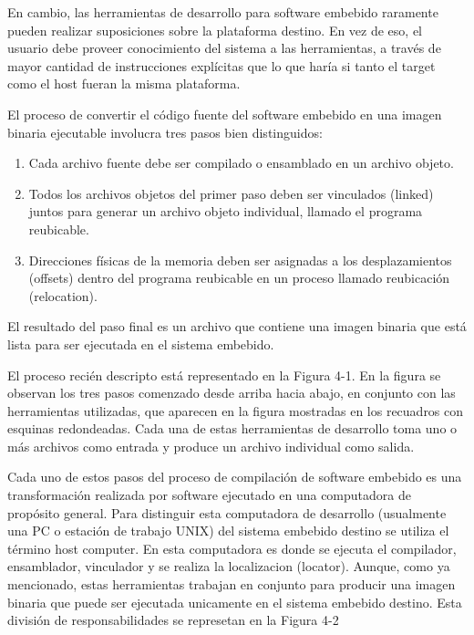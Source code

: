 \documentclass[12pt]{article}
\begin{document}

En cambio, las herramientas de desarrollo para software embebido 
raramente pueden realizar suposiciones sobre la plataforma destino.
En vez de eso, el usuario debe proveer 
conocimiento del sistema a las herramientas, a través 
de mayor cantidad de instrucciones explícitas que lo que haría
si tanto el target como el host fueran la misma plataforma.

El proceso de convertir el código fuente del software embebido
en una imagen binaria ejecutable involucra tres pasos bien distinguidos:

\begin{enumerate}
\item Cada archivo fuente debe ser compilado o ensamblado en un archivo objeto.
\item Todos los archivos objetos del primer paso deben ser vinculados (linked)
juntos para generar un archivo objeto individual, llamado el programa reubicable.
\item Direcciones físicas de la memoria deben ser asignadas a los desplazamientos (offsets)
dentro del programa reubicable en un proceso llamado reubicación (relocation).
\end{enumerate}

El resultado del paso final es un archivo que contiene una imagen binaria
que está lista para ser ejecutada en el sistema embebido.

El proceso recién descripto está representado en la Figura 4-1.
En la figura se observan los tres pasos comenzado desde arriba hacia abajo,
en conjunto con las herramientas utilizadas, que aparecen en la figura
mostradas en los recuadros con esquinas redondeadas.
Cada una de estas herramientas de desarrollo toma uno o más archivos como entrada
y produce un archivo individual como salida. 

Cada uno de estos pasos del proceso de compilación de software embebido
es una transformación realizada por software ejecutado en una computadora
de propósito general. Para distinguir esta computadora de desarrollo (usualmente una 
PC o estación de trabajo UNIX) del sistema embebido destino se utiliza el término host computer.
En esta computadora es donde se ejecuta el compilador, ensamblador, vinculador y se realiza la localizacion (locator).
Aunque, como ya mencionado, estas herramientas trabajan en conjunto
para producir una imagen binaria que puede ser ejecutada
unicamente en el sistema embebido destino. Esta división de responsabilidades
se represetan en la Figura 4-2
\end{document}
